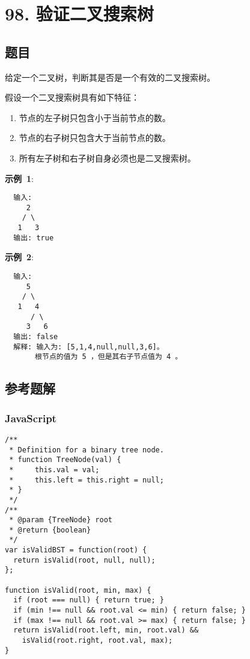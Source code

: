 \newpage
\section{98. 验证二叉搜索树}
\label{leetcode:98}

\subsection{题目}

给定一个二叉树，判断其是否是一个有效的二叉搜索树。

假设一个二叉搜索树具有如下特征：

\begin{enumerate}
  \item 节点的左子树只包含小于当前节点的数。
  \item 节点的右子树只包含大于当前节点的数。
  \item 所有左子树和右子树自身必须也是二叉搜索树。
\end{enumerate}

\textbf{示例 1}:

\begin{verbatim}
  输入:
     2
    / \
   1   3
  输出: true
\end{verbatim}

\textbf{示例 2}:

\begin{verbatim}
  输入:
     5
    / \
   1   4
      / \
     3   6
  输出: false
  解释: 输入为: [5,1,4,null,null,3,6]。
       根节点的值为 5 ，但是其右子节点值为 4 。
\end{verbatim}

\subsection{参考题解}

\subsubsection{JavaScript}

\begin{verbatim}
/**
 * Definition for a binary tree node.
 * function TreeNode(val) {
 *     this.val = val;
 *     this.left = this.right = null;
 * }
 */
/**
 * @param {TreeNode} root
 * @return {boolean}
 */
var isValidBST = function(root) {
  return isValid(root, null, null);
};

function isValid(root, min, max) {
  if (root === null) { return true; }
  if (min !== null && root.val <= min) { return false; }
  if (max !== null && root.val >= max) { return false; }
  return isValid(root.left, min, root.val) &&
    isValid(root.right, root.val, max);
}
\end{verbatim}

